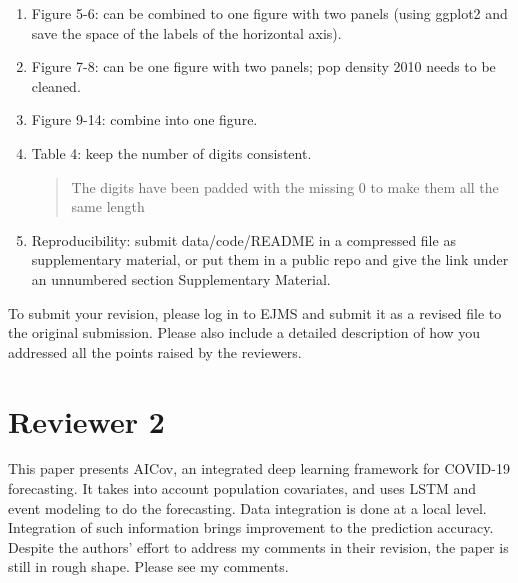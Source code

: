\begin{enumerate}
\item \DOIT  Figure 5-6: can be combined to one figure with two panels (using ggplot2 and save the space of the labels of the horizontal axis).

\begin{quote}
\end{quote}

\item \DOIT  Figure 7-8: can be one figure with two panels; pop density 2010 needs to be cleaned.

\begin{quote}
\end{quote}

\item \DOIT  Figure 9-14: combine into one figure.

\begin{quote}
\end{quote}

\item \DONE  Table 4: keep the number of digits consistent.

\begin{quote}
    The digits have been padded with the missing 0 to make them all the same length
\end{quote}

\item \DOIT  Reproducibility: submit data/code/README in a compressed file as supplementary material, or put them in a public repo and give the link under an unnumbered section Supplementary Material.

\begin{quote}
\end{quote}

\end{enumerate}

To submit your revision, please log in to EJMS and submit it as a revised file to the original submission. Please also include a detailed description of how you addressed all the points raised by the reviewers.

\section*{Reviewer 2}

This paper presents AICov, an integrated deep learning framework for COVID-19 forecasting. It takes into account population covariates, and uses LSTM and event modeling to do the forecasting. Data integration is done at a local level. Integration of such information brings improvement to the prediction accuracy. Despite the authors’ effort to address my comments in their revision, the paper is still in rough shape. Please see my comments.

